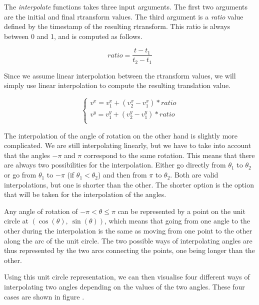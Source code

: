 The \textit{interpolate} functions takes three input arguments. The first two arguments are the initial and final rtransform values. The third argument is a \textit{ratio} value defined by the timestamp of the resulting rtransform. This ratio is always between 0 and 1, and is computed as follows.

\[
    ratio = \frac{t - t_1}{t_2 - t_1}
\]

Since we assume linear interpolation between the rtransform values, we will simply use linear interpolation to compute the resulting translation value.

\[
    \begin{cases}
        v^x = v_1^x + (v_2^x - v_1^x) * ratio \\
        v^y = v_1^y + (v_2^y - v_1^y) * ratio \\
    \end{cases}
\]

The interpolation of the angle of rotation on the other hand is slightly more complicated. We are still interpolating linearly, but we have to take into account that the angles $-\pi$ and $\pi$ correspond to the same rotation. This means that there are always two possibilities for the interpolation. Either go directly from $\theta_1$ to $\theta_2$ or go from $\theta_1$ to $-\pi$ (if $\theta_1 < \theta_2$) and then from $\pi$ to $\theta_2$. Both are valid interpolations, but one is shorter than the other. The shorter option is the option that will be taken for the interpolation of the angles.


Any angle of rotation of $-\pi < \theta \le \pi$ can be represented by a point on the unit circle at $(\cos(\theta),\ \sin(\theta))$, which means that going from one angle to the other during the interpolation is the same as moving from one point to the other along the arc of the unit circle. The two possible ways of interpolating angles are thus represented by the two arcs connecting the points, one being longer than the other.


Using this unit circle representation, we can then visualise four different ways of interpolating two angles depending on the values of the two angles. These four cases are shown in figure .


